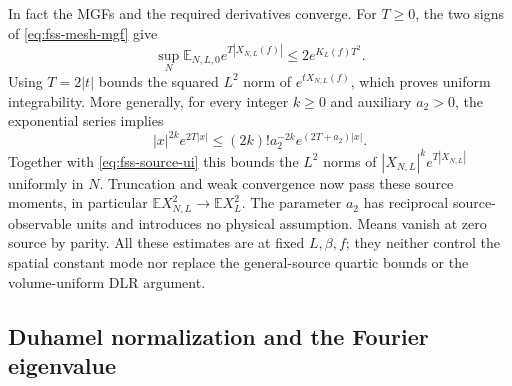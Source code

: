 \documentclass[11pt]{article}
\numberwithin{equation}{section}
\theoremstyle{definition}
\newcommand{\E}{\mathbb E}
\begin{document}
In fact the MGFs and the required derivatives converge.  For $T\geq0$,
the two signs of \eqref{eq:fss-mesh-mgf} give
\begin{equation}
 \sup_N\E_{N,L,0}e^{T|X_{N,L}(f)|}\leq2e^{K_L(f)T^2}.
 \label{eq:fss-source-ui}
\end{equation}
Using $T=2|t|$ bounds the squared $L^2$ norm of $e^{tX_{N,L}(f)}$,
which proves uniform integrability.  More generally, for every integer
$k\geq0$ and auxiliary $a_2>0$, the exponential series implies
\[
 |x|^{2k}e^{2T|x|}\leq(2k)!a_2^{-2k}e^{(2T+a_2)|x|}.
\]
Together with \eqref{eq:fss-source-ui} this bounds the $L^2$ norms of
$|X_{N,L}|^ke^{T|X_{N,L}|}$ uniformly in $N$.  Truncation and weak
convergence now pass these source moments, in particular
$\E X_{N,L}^2\to\E X_L^2$.  The parameter $a_2$ has reciprocal source-
observable units and introduces no physical assumption.  Means vanish at
zero source by parity.  All these estimates are at fixed $L,\beta,f$;
they neither control the spatial constant mode nor replace the general-source
quartic bounds or the volume-uniform DLR argument.

\subsection{Duhamel normalization and the Fourier eigenvalue}
\label{sec:infrared-duhamel}
\end{document}
